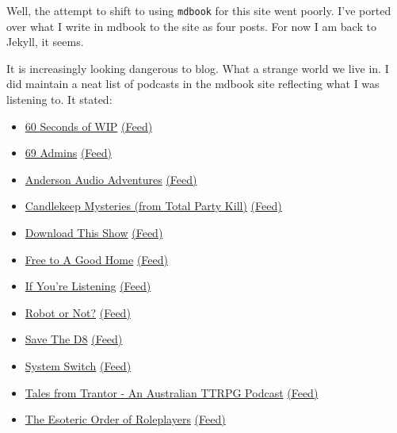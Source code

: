 Well, the attempt to shift to using \texttt{mdbook} for this site went
poorly. I've ported over what I write in mdbook to the site as four
posts. For now I am back to Jekyll, it seems.

It is increasingly looking dangerous to blog. What a strange world we
live in. I did maintain a neat list of podcasts in the mdbook site
reflecting what I was listening to. It stated:

\begin{itemize}
\item
  \href{https://mwl.io/}{60 Seconds of WIP}
  \href{https://mwl.io/feed/60sow-mp3}{(Feed)}
\item
  \href{https://69admins.com/}{69 Admins}
  \href{https://feeds.acast.com/public/shows/6410a80dec813e00110faed2}{(Feed)}
\item
  \href{https://www.gerryanderson.com/}{Anderson Audio Adventures}
  \href{https://feeds.captivate.fm/andersonaudioadventures/}{(Feed)}
\item
  \href{https://www.theincomparable.com/tpk/candlekeep/}{Candlekeep
  Mysteries (from Total Party Kill)}
  \href{http://feeds.theincomparable.com/tpk/candlekeep}{(Feed)}
\item
  \href{https://www.abc.net.au/listen/programs/downloadthisshow/}{Download
  This Show}
  \href{https://www.abc.net.au/feeds/12801214/podcast.xml}{(Feed)}
\item
  \href{http://freetoagoodhome.libsyn.com/}{Free to A Good Home}
  \href{https://feeds.acast.com/public/shows/60e5013bce8a4200126b891c}{(Feed)}
\item
  \href{https://www.abc.net.au/listen/programs/if-youre-listening/}{If
  You're Listening}
  \href{https://www.abc.net.au/feeds/9593214/podcast.xml}{(Feed)}
\item
  \href{https://www.theincomparable.com/robot/}{Robot or Not?}
  \href{https://feeds.theincomparable.com/robot}{(Feed)}
\item
  \href{https://www.savethed8pod.com/}{Save The D8}
  \href{https://anchor.fm/s/796a788/podcast/rss}{(Feed)}
\item
  \href{https://linktr.ee/sysw}{System Switch}
  \href{https://anchor.fm/s/83b36ba8/podcast/rss}{(Feed)}
\item
  \href{http://talesfromtrantor.com/}{Tales from Trantor - An Australian
  TTRPG Podcast} \href{https://talesfromtrantor.libsyn.com/rss}{(Feed)}
\item
  \href{http://esoteric-rp.blogspot.com/}{The Esoteric Order of
  Roleplayers}
  \href{https://feed.podbean.com/esotericrp/feed.xml}{(Feed)}

\end{itemize}
